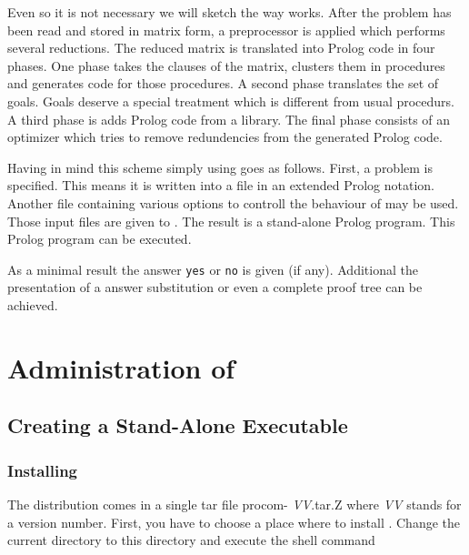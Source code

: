 Even so it is not necessary we will sketch the way \ProCom{} works.  After the
problem has been read and stored in matrix form, a preprocessor is applied
which performs several reductions. The reduced matrix is translated into
Prolog code in four phases. One phase takes the clauses of the matrix,
clusters them in procedures and generates code for those procedures. A second
phase translates the set of goals. Goals deserve a special treatment which is
different from usual procedurs. A third phase is adds Prolog code from a
library. The final phase consists of an optimizer which tries to remove
redundencies from the generated Prolog code.

\newpage
Having in mind this scheme simply using \ProCom{} goes as follows. First, a
problem is specified. This means it is written into a file in an extended
Prolog notation. Another file containing various options to controll the
behaviour of \ProCom{} may be used. Those input files are given to \ProCom.
The result is a stand-alone Prolog program. This Prolog program can be
executed. 

As a minimal result the answer {\tt yes} or {\tt no} is given (if any).
Additional the presentation of a answer substitution or even a complete proof
tree can be achieved.







\chapter{Administration of \ProCom}

\section{Creating a Stand-Alone Executable}



\subsection{Installing \ProCom}\label{sec:installation}

The \ProCom{} distribution comes in a single tar file {\sf procom-{\em
VV}.tar.Z} where {\em VV} stands for a version number. First, you have to
choose a place where to install \ProCom. Change the current directory to this
directory and execute the shell command

